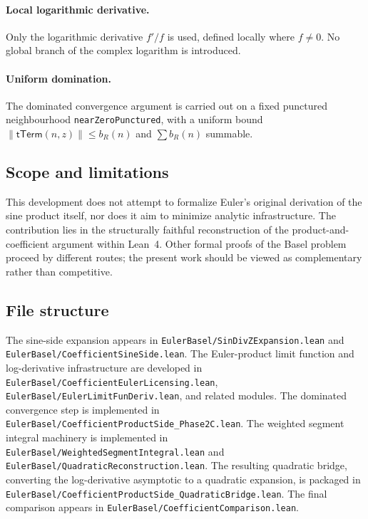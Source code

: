\documentclass[11pt,a4paper]{article}
\theoremstyle{plain}
\theoremstyle{definition}
\DeclareRobustCommand{\codepath}[1]{\nolinkurl{#1}}
\DeclareRobustCommand{\codepath}[1]{\nolinkurl{#1}}
\begin{document}
\paragraph{Local logarithmic derivative.}
Only the logarithmic derivative \(f'/f\) is used, defined locally where \(f \neq 0\). No global branch of the complex logarithm is introduced.

\paragraph{Uniform domination.}
The dominated convergence argument is carried out on a fixed punctured neighbourhood \texttt{nearZeroPunctured}, with a uniform bound
\(\lVert \mathsf{tTerm}(n,z)\rVert \le b_{R}(n)\)
and \(\sum b_{R}(n)\) summable.

\subsection{Scope and limitations}

This development does not attempt to formalize Euler’s original derivation of the sine product itself, nor does it aim to minimize analytic infrastructure. The contribution lies in the structurally faithful reconstruction of the product-and-coefficient argument within Lean~4. Other formal proofs of the Basel problem proceed by different routes; the present work should be viewed as complementary rather than competitive.

\subsection{File structure}

The sine-side expansion appears in \codepath{EulerBasel/SinDivZExpansion.lean} and \codepath{EulerBasel/CoefficientSineSide.lean}.  
The Euler-product limit function and log-derivative infrastructure are developed in \codepath{EulerBasel/CoefficientEulerLicensing.lean}, \codepath{EulerBasel/EulerLimitFunDeriv.lean}, and related modules.  
The dominated convergence step is implemented in \codepath{EulerBasel/CoefficientProductSide_Phase2C.lean}.  
The weighted segment integral machinery is implemented in
\codepath{EulerBasel/WeightedSegmentIntegral.lean} and
\codepath{EulerBasel/QuadraticReconstruction.lean}.
The resulting quadratic bridge, converting the log-derivative asymptotic to a quadratic
expansion, is packaged in
\codepath{EulerBasel/CoefficientProductSide_QuadraticBridge.lean}.
The final comparison appears in \codepath{EulerBasel/CoefficientComparison.lean}.
\end{document}
